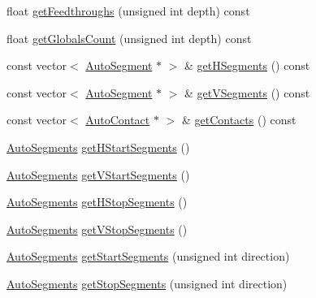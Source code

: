 \begin{DoxyCompactItemize}
\item 
float \mbox{\hyperlink{classKatabatic_1_1GCell_a14feed45699c8dc406251519dc08bc79}{get\+Feedthroughs}} (unsigned int depth) const
\item 
float \mbox{\hyperlink{classKatabatic_1_1GCell_a4785bcc49da76fc38f6940f5b1cc5b17}{get\+Globals\+Count}} (unsigned int depth) const
\item 
const vector$<$ \mbox{\hyperlink{classKatabatic_1_1AutoSegment}{Auto\+Segment}} $\ast$ $>$ \& \mbox{\hyperlink{classKatabatic_1_1GCell_a81575302a8794958c310dc101807e9c5}{get\+H\+Segments}} () const
\item 
const vector$<$ \mbox{\hyperlink{classKatabatic_1_1AutoSegment}{Auto\+Segment}} $\ast$ $>$ \& \mbox{\hyperlink{classKatabatic_1_1GCell_ac3c357d72a24990494758dcc216e3b1e}{get\+V\+Segments}} () const
\item 
const vector$<$ \mbox{\hyperlink{classKatabatic_1_1AutoContact}{Auto\+Contact}} $\ast$ $>$ \& \mbox{\hyperlink{classKatabatic_1_1GCell_aacf50ce6dcef3a7523453725af7feeae}{get\+Contacts}} () const
\item 
\mbox{\hyperlink{namespaceKatabatic_a2221b0ddbc24f331809fc86f98e38041}{Auto\+Segments}} \mbox{\hyperlink{classKatabatic_1_1GCell_a79668a41675e9ba0ca59d4b91e3b70be}{get\+H\+Start\+Segments}} ()
\item 
\mbox{\hyperlink{namespaceKatabatic_a2221b0ddbc24f331809fc86f98e38041}{Auto\+Segments}} \mbox{\hyperlink{classKatabatic_1_1GCell_acbd17a4441905a4f5bc33a26bb338d0a}{get\+V\+Start\+Segments}} ()
\item 
\mbox{\hyperlink{namespaceKatabatic_a2221b0ddbc24f331809fc86f98e38041}{Auto\+Segments}} \mbox{\hyperlink{classKatabatic_1_1GCell_a77beccf65527a330f15bed2aba4f9dea}{get\+H\+Stop\+Segments}} ()
\item 
\mbox{\hyperlink{namespaceKatabatic_a2221b0ddbc24f331809fc86f98e38041}{Auto\+Segments}} \mbox{\hyperlink{classKatabatic_1_1GCell_a2f0f038f5700b7b55f22829c5d43aa07}{get\+V\+Stop\+Segments}} ()
\item 
\mbox{\hyperlink{namespaceKatabatic_a2221b0ddbc24f331809fc86f98e38041}{Auto\+Segments}} \mbox{\hyperlink{classKatabatic_1_1GCell_a1f92568d22b1384a8cdf328340fb9160}{get\+Start\+Segments}} (unsigned int direction)
\item 
\mbox{\hyperlink{namespaceKatabatic_a2221b0ddbc24f331809fc86f98e38041}{Auto\+Segments}} \mbox{\hyperlink{classKatabatic_1_1GCell_a80ad0f9e79bccf6aed4fb69b4b795005}{get\+Stop\+Segments}} (unsigned int direction)
\item 

\end{DoxyCompactItemize}
